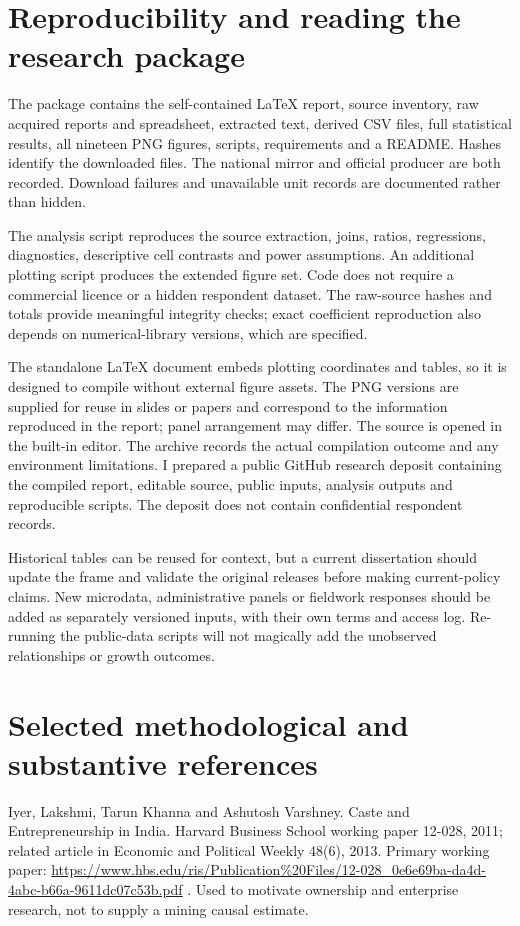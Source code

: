 \documentclass[11pt,a4paper]{report}
\begin{document}
\chapter{Reproducibility and reading the research package}
The package contains the self-contained LaTeX report, source inventory, raw acquired reports and spreadsheet, extracted text, derived CSV files, full statistical results, all nineteen PNG figures, scripts, requirements and a README. Hashes identify the downloaded files. The national mirror and official producer are both recorded. Download failures and unavailable unit records are documented rather than hidden.

The analysis script reproduces the source extraction, joins, ratios, regressions, diagnostics, descriptive cell contrasts and power assumptions. An additional plotting script produces the extended figure set. Code does not require a commercial licence or a hidden respondent dataset. The raw-source hashes and totals provide meaningful integrity checks; exact coefficient reproduction also depends on numerical-library versions, which are specified.

The standalone LaTeX document embeds plotting coordinates and tables, so it is designed to compile without external figure assets. The PNG versions are supplied for reuse in slides or papers and correspond to the information reproduced in the report; panel arrangement may differ. The source is opened in the built-in editor. The archive records the actual compilation outcome and any environment limitations. I prepared a public GitHub research deposit containing the compiled report, editable source, public inputs, analysis outputs and reproducible scripts. The deposit does not contain confidential respondent records.

Historical tables can be reused for context, but a current dissertation should update the frame and validate the original releases before making current-policy claims. New microdata, administrative panels or fieldwork responses should be added as separately versioned inputs, with their own terms and access log. Re-running the public-data scripts will not magically add the unobserved relationships or growth outcomes.

\chapter{Selected methodological and substantive references}
Iyer, Lakshmi, Tarun Khanna and Ashutosh Varshney. Caste and Entrepreneurship in India. Harvard Business School working paper 12-028, 2011; related article in Economic and Political Weekly 48(6), 2013. Primary working paper: \url{https://www.hbs.edu/ris/Publication%20Files/12-028_0e6e69ba-da4d-4abc-b66a-9611dc07c53b.pdf} . Used to motivate ownership and enterprise research, not to supply a mining causal estimate.
\end{document}
